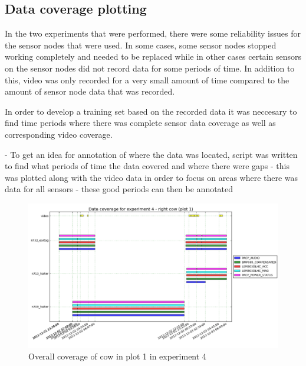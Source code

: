 \subsection{Data coverage plotting}

In the two experiments that were performed, there were some reliability issues for the sensor nodes that were used. In some cases, some sensor nodes stopped working completely and needed to be replaced while in other cases certain sensors on the sensor nodes did not record data for some periods of time. In addition to this, video was only recorded for a very small amount of time compared to the amount of sensor node data that was recorded. 

In order to develop a training set based on the recorded data it was neccesary to find time periods where there was complete sensor data coverage as well as corresponding video coverage.


- To get an idea for annotation of where the data was located, script was written to find what periods of time the data covered and where there were gaps
- this was plotted along with the video data in order to focus on areas where there was data for all sensors
- these good periods can then be annotated

\begin{figure}[ht!]
\begin{center}
\leavevmode
\includegraphics[width=1\textwidth]{images/experiment4_coverage_overall.png}
\end{center}
\caption{Overall coverage of cow in plot 1 in experiment 4}
\label{exp4overall}
\end{figure}

